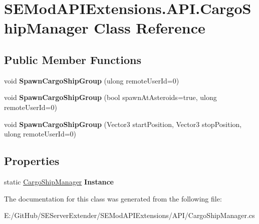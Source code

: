 \hypertarget{class_s_e_mod_a_p_i_extensions_1_1_a_p_i_1_1_cargo_ship_manager}{}\section{S\+E\+Mod\+A\+P\+I\+Extensions.\+A\+P\+I.\+Cargo\+Ship\+Manager Class Reference}
\label{class_s_e_mod_a_p_i_extensions_1_1_a_p_i_1_1_cargo_ship_manager}
\subsection*{Public Member Functions}
\begin{DoxyCompactItemize}
\item 
\hypertarget{class_s_e_mod_a_p_i_extensions_1_1_a_p_i_1_1_cargo_ship_manager_a23b9ed36dd477968155cbb76cf783316}{}void {\bfseries Spawn\+Cargo\+Ship\+Group} (ulong remote\+User\+Id=0)\label{class_s_e_mod_a_p_i_extensions_1_1_a_p_i_1_1_cargo_ship_manager_a23b9ed36dd477968155cbb76cf783316}

\item 
\hypertarget{class_s_e_mod_a_p_i_extensions_1_1_a_p_i_1_1_cargo_ship_manager_a71b5802224586ce25f7786c0e1422d12}{}void {\bfseries Spawn\+Cargo\+Ship\+Group} (bool spawn\+At\+Asteroids=true, ulong remote\+User\+Id=0)\label{class_s_e_mod_a_p_i_extensions_1_1_a_p_i_1_1_cargo_ship_manager_a71b5802224586ce25f7786c0e1422d12}

\item 
\hypertarget{class_s_e_mod_a_p_i_extensions_1_1_a_p_i_1_1_cargo_ship_manager_ac827524e12bf8bdbec7b0200fd73640a}{}void {\bfseries Spawn\+Cargo\+Ship\+Group} (Vector3 start\+Position, Vector3 stop\+Position, ulong remote\+User\+Id=0)\label{class_s_e_mod_a_p_i_extensions_1_1_a_p_i_1_1_cargo_ship_manager_ac827524e12bf8bdbec7b0200fd73640a}

\end{DoxyCompactItemize}
\subsection*{Properties}
\begin{DoxyCompactItemize}
\item 
\hypertarget{class_s_e_mod_a_p_i_extensions_1_1_a_p_i_1_1_cargo_ship_manager_acb1a925abf7a4db16ec532cdb005d228}{}static \hyperlink{class_s_e_mod_a_p_i_extensions_1_1_a_p_i_1_1_cargo_ship_manager}{Cargo\+Ship\+Manager} {\bfseries Instance}\label{class_s_e_mod_a_p_i_extensions_1_1_a_p_i_1_1_cargo_ship_manager_acb1a925abf7a4db16ec532cdb005d228}

\end{DoxyCompactItemize}


The documentation for this class was generated from the following file\+:\begin{DoxyCompactItemize}
\item 
E\+:/\+Git\+Hub/\+S\+E\+Server\+Extender/\+S\+E\+Mod\+A\+P\+I\+Extensions/\+A\+P\+I/Cargo\+Ship\+Manager.\+cs\end{DoxyCompactItemize}
